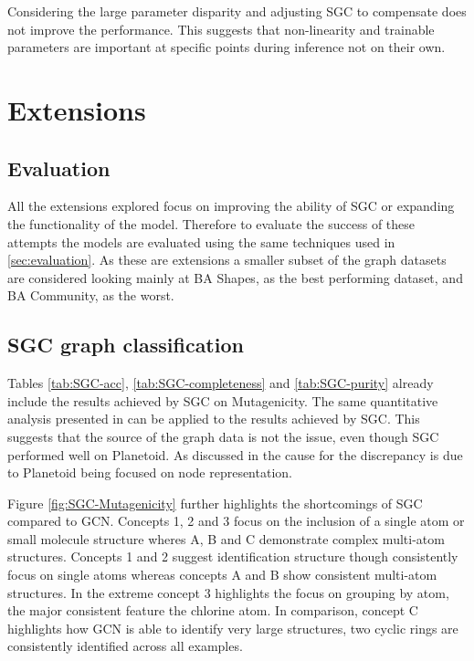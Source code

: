 Considering the large parameter disparity and adjusting SGC to compensate does not improve the performance.
This suggests that non-linearity and trainable parameters are important at specific points during inference not on their own.

\section{Extensions}
\label{sec:extension-eval}
\subsection{Evaluation}
All the extensions explored focus on improving the ability of SGC or expanding the functionality of the model.
Therefore to evaluate the success of these attempts the models are evaluated using the same techniques used in \ref{sec:evaluation}.
As these are extensions a smaller subset of the graph datasets are considered looking mainly at BA Shapes, as the best performing dataset, and BA Community, as the worst.

\subsection{SGC graph classification}
\label{SGC-graph}

Tables \ref{tab:SGC-acc}, \ref{tab:SGC-completeness} and \ref{tab:SGC-purity} already include the results achieved by SGC on Mutagenicity.
The same quantitative analysis presented in  can be applied to the results achieved by SGC.
This suggests that the source of the graph data is not the issue, even though SGC performed well on Planetoid\cite{Fey/Lenssen/2019}.
As discussed in  the cause for the discrepancy is due to Planetoid\cite{Fey/Lenssen/2019} being focused on node representation.

Figure \ref{fig:SGC-Mutagenicity} further highlights the shortcomings of SGC compared to GCN.
Concepts 1, 2 and 3 focus on the inclusion of a single atom or small molecule structure wheres A, B and C demonstrate complex multi-atom structures.
Concepts 1 and 2 suggest identification structure though consistently focus on single atoms whereas concepts A and B show consistent multi-atom structures.
In the extreme concept 3 highlights the focus on grouping by atom, the major consistent feature the chlorine atom.
In comparison, concept C highlights how GCN is able to identify very large structures, two cyclic rings are consistently identified across all examples.

